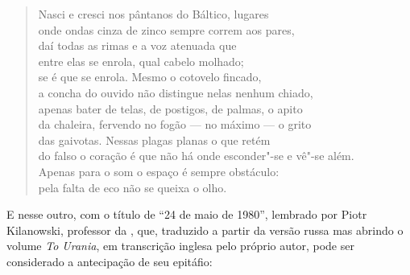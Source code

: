 \begin{verse}
Nasci e cresci nos pântanos do Báltico, \qb{}lugares \\
onde ondas cinza de zinco sempre correm \qb{}aos pares, \\
daí todas as rimas e a voz atenuada que \\
entre elas se enrola, qual cabelo molhado; \\
se é que se enrola. Mesmo o cotovelo \qb{}fincado, \\
a concha do ouvido não distingue nelas \qb{}nenhum chiado, \\
apenas bater de telas, de postigos, \qb{}de palmas, o apito \\
da chaleira, fervendo no fogão --- no máximo \qb{}--- o grito \\
das gaivotas. Nessas plagas planas o que \qb{}retém \\
do falso o coração é que não há onde \qb{}esconder"-se e vê"-se além. \\
Apenas para o som o espaço é sempre \qb{}obstáculo: \\
pela falta de eco não se queixa o olho.
\end{verse}

E nesse outro, com o título de ``24 de maio de 1980'', lembrado por
Piotr Kilanowski, professor da , que, traduzido a partir da versão russa mas abrindo o volume
\emph{To Urania}, em transcrição inglesa pelo próprio
autor, pode ser considerado a antecipação de seu epitáfio:

